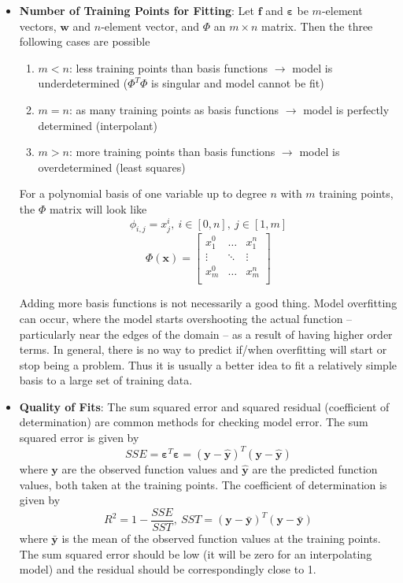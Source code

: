\documentclass[12pt]{article}
\newcommand{\Item}[1]{\item \textbf{#1}:}
\newcommand{\CenteredBoxed}[1]{\begin{center}\boxed{#1}\end{center}}
\newcommand{\sumlim}[2]{\sum\limits_{#1}^{#2}}
\newcommand{\boldx}{\mathbf{x}}
\begin{document}
\begin{itemize}
\CenteredBoxed{\mathcal{N}_{terms} = \sumlim{q=1}{n}{{q+p-1}\choose{q}} = \sumlim{q=1}{n}\frac{(q+p-1)!}{(q!)(p-1)!}}
\Item{Number of Training Points for Fitting} Let $\bm{f}$ and $\bm{\varepsilon}$ be $m$-element vectors, $\bm{w}$ and $n$-element vector, and $\Phi$ an $m\times n$ matrix. Then the three following cases are possible
	\begin{enumerate}
	\item $m<n$: less training points than basis functions $\to$ model is underdetermined ($\Phi^T\Phi$ is singular and model cannot be fit)
	\item $m=n$: as many training points as basis functions $\to$ model is perfectly determined (interpolant)
	\item $m>n$: more training points than basis functions $\to$ model is overdetermined (least squares)
	\end{enumerate}
For a polynomial basis of one variable up to degree $n$ with $m$ training points, the $\Phi$ matrix will look like
$$\phi_{i,j}=x_j^i,\ i\in[0,n],\ j\in[1,m]$$
\[\Phi(\boldx) =  \begin{bmatrix}
x_1^0 & \dots & x_1^{n}\\
\vdots & \ddots & \vdots\\
x_m^0 & \dots & x_m^n\\
\end{bmatrix}\]

Adding more basis functions is not necessarily a good thing. Model overfitting can occur, where the model starts overshooting the actual function -- particularly near the edges of the domain -- as a result of having higher order terms. In general, there is no way to predict if/when overfitting will start or stop being a problem. Thus it is usually a better idea to fit a relatively simple basis to a large set of training data.
\Item{Quality of Fits} The sum squared error and squared residual (coefficient of determination) are common methods for checking model error. The sum squared error is given by 
$$SSE=\bm{\varepsilon}^T\bm{\varepsilon}=(\bm{y}-\bm{\hat{y}})^T(\bm{y}-\bm{\hat{y}})$$
where $\bm{y}$ are the observed function values and $\bm{\hat{y}}$ are the predicted function values, both taken at the training points. The coefficient of determination is given by
$$R^2=1-\frac{SSE}{SST},\ SST=(\bm{y}-\bm{\bar{y}})^T(\bm{y}-\bm{\bar{y}})$$
where $\bm{\bar{y}}$ is the mean of the observed function values at the training points. The sum squared error should be low (it will be zero for an interpolating model) and the residual should be correspondingly close to 1.\\


\end{itemize}
\end{document}
